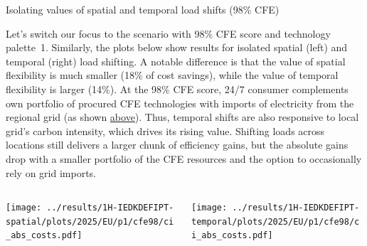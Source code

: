 \begin{frame}{Isolating values of spatial and temporal load shifts (98\% CFE)}

  {\footnotesize
  \vspace{-0.2cm}
  Let's switch our focus to the scenario with \alert{98\% CFE score and technology palette~1}. Similarly, the plots below show results for isolated spatial (left) and temporal (right) load shifting. A notable difference is that the value of spatial flexibility is much smaller (18\% of cost savings), while the value of temporal flexibility is larger (14\%). At the 98\% CFE score, 24/7 consumer complements own portfolio of procured CFE technologies with imports of electricity from the regional grid (as shown \hyperlink{cfe98cost}{above}). Thus, temporal shifts are also \alert{responsive to local grid's carbon intensity}, which drives its rising value. Shifting loads across locations still delivers a larger chunk of efficiency gains, but the absolute gains drop with a smaller portfolio of the CFE resources and the option to occasionally rely on grid imports.

  \begin{columns}
    \begin{column}{7cm}
    \texttt{[image: ../results/1H-IEDKDEFIPT-spatial/plots/2025/EU/p1/cfe98/ci\_abs\_costs.pdf]}
    \end{column}
    
    \begin{column}{7cm}
    \texttt{[image: ../results/1H-IEDKDEFIPT-temporal/plots/2025/EU/p1/cfe98/ci\_abs\_costs.pdf]}
    \end{column}
  \end{columns}

  }
\end{frame}


